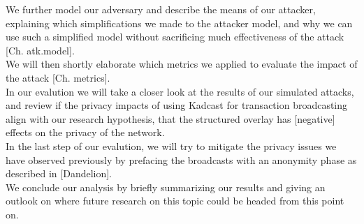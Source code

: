 We further model our adversary and describe the means of our attacker, explaining
which simplifications we made to the attacker model, and why we can use such a simplified model
without sacrificing much effectiveness of the attack [Ch. atk.model]. \\
We will then shortly elaborate which metrics we applied to evaluate the impact of the attack [Ch. metrics]. \\
In our evalution we will take a closer look at the results of our simulated attacks, and
review if the privacy impacts of using Kadcast for transaction broadcasting align with our
research hypothesis, that the structured overlay has [negative] effects on the privacy of the network. \\
In the last step of our evalution, we will try to mitigate the privacy issues we have observed previously
by prefacing the broadcasts with an anonymity phase as described in [Dandelion]. \\
We conclude our analysis by briefly summarizing our results and giving an outlook
on where future research on this topic could be headed from this point on.



